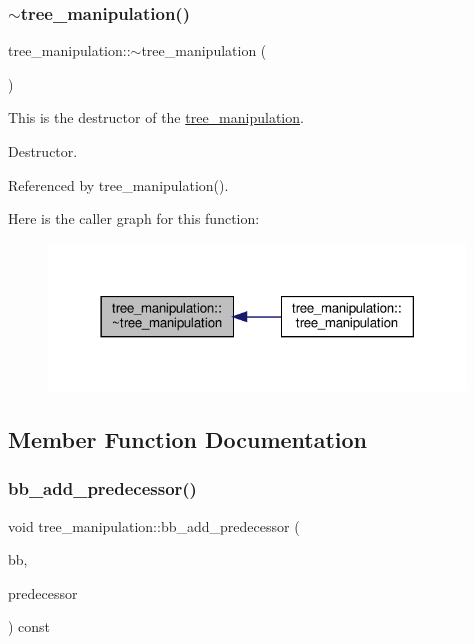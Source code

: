 \subsubsection{\texorpdfstring{$\sim$tree\+\_\+manipulation()}{~tree\_manipulation()}}
{\footnotesize\ttfamily tree\+\_\+manipulation\+::$\sim$tree\+\_\+manipulation (\begin{DoxyParamCaption}{ }\end{DoxyParamCaption})\hspace{0.3cm}{\ttfamily [default]}}



This is the destructor of the \hyperlink{classtree__manipulation}{tree\+\_\+manipulation}. 

Destructor. 

Referenced by tree\+\_\+manipulation().

Here is the caller graph for this function\+:
\nopagebreak
\begin{figure}[H]
\begin{center}
\leavevmode
\includegraphics[width=314pt]{d0/d99/classtree__manipulation_a77557dd87ecad9255e0fa23178aead99_icgraph}
\end{center}
\end{figure}


\subsection{Member Function Documentation}
\mbox{\label{classtree__manipulation_ae2668d4d94dcfceb8077a7d849fc89a1}} 
\subsubsection{\texorpdfstring{bb\+\_\+add\+\_\+predecessor()}{bb\_add\_predecessor()}}
{\footnotesize\ttfamily void tree\+\_\+manipulation\+::bb\+\_\+add\+\_\+predecessor (\begin{DoxyParamCaption}\item[{bloc\+Ref \&}]{bb,  }\item[{const unsigned int \&}]{predecessor }\end{DoxyParamCaption}) const}



